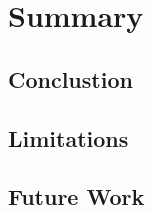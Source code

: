\chapter{Summary}
\label{sec:zus}


\section{Conclustion}

\section{Limitations}

\section{Future Work}
